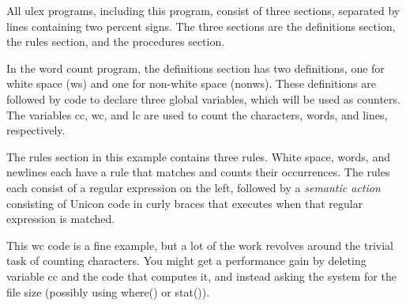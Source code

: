 
All \textsf{ulex} programs, including this program, consist of three
sections, separated by lines containing two percent signs. The three
sections are the definitions section, the rules section, and the
procedures section.

In the word count program, the definitions section has two definitions,
one for white space (\textsf{ws}) and one for non-white space
(\textsf{nonws}). These definitions are followed by code to declare
three global variables, which will be used as counters. The variables
\textsf{cc}, \textsf{wc}, and \textsf{lc} are used to count the
characters, words, and lines, respectively.

The rules section in this example contains three rules. White space,
words, and newlines each have a rule that matches and counts their
occurrences. The rules each consist of a regular expression on the
left, followed by a {\em semantic action\/} consisting of Unicon code
in curly braces that executes when that regular expression is matched.

This \textsf{wc} code is a fine example, but a lot of the work
revolves around the trivial task of counting characters. You might
get a performance gain by deleting variable cc and the code that
computes it, and instead asking the system for the file size (possibly
using \textsf{where()} or \textsf{stat()}).

